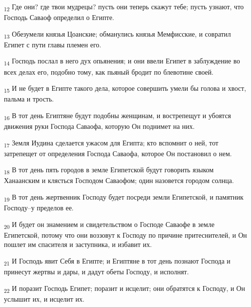 \begin{tcolorbox}
\textsubscript{12} Где они? где твои мудрецы? пусть они теперь скажут тебе; пусть узнают, что Господь Саваоф определил о Египте.
\end{tcolorbox}
\begin{tcolorbox}
\textsubscript{13} Обезумели князья Цоанские; обманулись князья Мемфисские, и совратил Египет с пути главы племен его.
\end{tcolorbox}
\begin{tcolorbox}
\textsubscript{14} Господь послал в него дух опьянения; и они ввели Египет в заблуждение во всех делах его, подобно тому, как пьяный бродит по блевотине своей.
\end{tcolorbox}
\begin{tcolorbox}
\textsubscript{15} И не будет в Египте такого дела, которое совершить умели бы голова и хвост, пальма и трость.
\end{tcolorbox}
\begin{tcolorbox}
\textsubscript{16} В тот день Египтяне будут подобны женщинам, и вострепещут и убоятся движения руки Господа Саваофа, которую Он поднимет на них.
\end{tcolorbox}
\begin{tcolorbox}
\textsubscript{17} Земля Иудина сделается ужасом для Египта; кто вспомнит о ней, тот затрепещет от определения Господа Саваофа, которое Он постановил о нем.
\end{tcolorbox}
\begin{tcolorbox}
\textsubscript{18} В тот день пять городов в земле Египетской будут говорить языком Ханаанским и клясться Господом Саваофом; один назовется городом солнца.
\end{tcolorbox}
\begin{tcolorbox}
\textsubscript{19} В тот день жертвенник Господу будет посреди земли Египетской, и памятник Господу--у пределов ее.
\end{tcolorbox}
\begin{tcolorbox}
\textsubscript{20} И будет он знамением и свидетельством о Господе Саваофе в земле Египетской, потому что они воззовут к Господу по причине притеснителей, и Он пошлет им спасителя и заступника, и избавит их.
\end{tcolorbox}
\begin{tcolorbox}
\textsubscript{21} И Господь явит Себя в Египте; и Египтяне в тот день познают Господа и принесут жертвы и дары, и дадут обеты Господу, и исполнят.
\end{tcolorbox}
\begin{tcolorbox}
\textsubscript{22} И поразит Господь Египет; поразит и исцелит; они обратятся к Господу, и Он услышит их, и исцелит их.
\end{tcolorbox}
